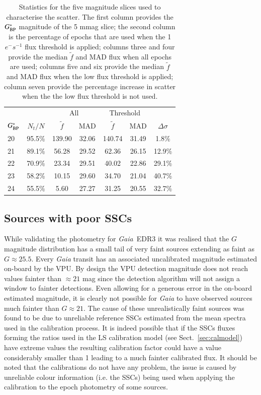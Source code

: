 \documentclass{aa}
\newcommand{\gaia}{\textit{Gaia}\xspace}
\newcommand{\gbp}{\ensuremath{G_{\rm BP}}\xspace}
\newcommand{\edr}{\gaia~EDR3\xspace}
\newcommand{\secname}{Sect.}
\newcommand{\secref}[1]{\secname~\ref{sec:#1}}
\begin{document}
\begin{table}[htp]
    \caption{Statistics for the five magnitude slices used to characterise the scatter. The first column provides the $\gbp^{\ast}$ magnitude of the 5 mmag slice; the second column is the percentage of epochs that are used when the 1 $e^-s^{-1}$ flux threshold is applied; columns three and four provide the median $\tilde{f}$ and MAD flux when all epochs are used; columns five and six provide the median $\tilde{f}$ and MAD flux when the low flux threshold is applied; column seven provide the percentage increase in scatter when the the low flux threshold is not used.}
    \label{tab:deltabp}
    \centering
    \begin{tabular}{lc|cc|cc|c}
    \hline\hline
    & & \multicolumn{2}{c}{All} & \multicolumn{2}{c}{Threshold} & \\
    $\gbp^{\ast}$ & $N_t/N$ & $\tilde{f}$ & MAD & $\tilde{f}$ & MAD & $\Delta\sigma$ \\
    \hline
    20 & 95.5\% & 139.90 & 32.06 & 140.74 & 31.49 & 1.8\%\\
    21 & 89.1\% &  56.28 & 29.52 &  62.36 & 26.15 & 12.9\%\\
    22 & 70.9\% &  23.34 & 29.51 &  40.02 & 22.86 & 29.1\%\\
    23 & 58.2\% &  10.15 & 29.60 &  34.70 & 21.04 & 40.7\%\\
    24 & 55.5\% &   5.60 & 27.27 &  31.25 & 20.55 & 32.7\%\\
    \hline
    \end{tabular}
\end{table}

\subsection{Sources with poor SSCs}

While validating the photometry for \edr it was realised that the $G$ magnitude distribution has a small tail of very faint sources extending as faint as $G\approx25.5$. Every \gaia transit has an associated uncalibrated magnitude estimated on-board by the VPU. By design \citep{VpuDetection} the VPU detection magnitude does not reach values fainter than $\approx21$ mag since the detection algorithm will not assign a window to fainter detections. Even allowing for a generous error in the on-board estimated magnitude, it is clearly not possible for \gaia to have observed sources much fainter than $G\approx21$. The cause of these unrealistically faint sources was found to be due to unreliable reference SSCs estimated from the mean spectra used in the calibration process. It is indeed possible that if the SSCs fluxes forming the ratios used in the LS calibration model (see \secref{calmodel}) have extreme values the resulting calibration factor could have a value considerably smaller than 1 leading to a much fainter calibrated flux. It should be noted that the calibrations do not have any problem, the issue is caused by unreliable colour information (i.e. the SSCs) being used when applying the calibration to the epoch photometry of some sources.
\end{document}
